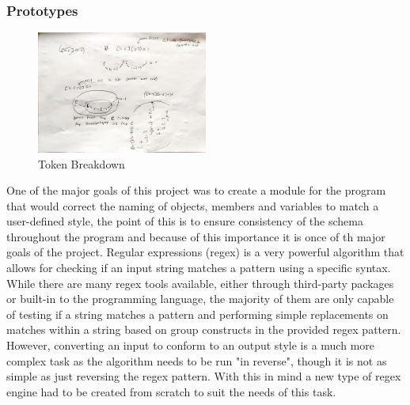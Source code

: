 \subsubsection{Prototypes}

\begin{figure}
    \centering
    \caption{Token Breakdown}
    \label{fig:TokenBreakdown}
    \includegraphics[angle=90,width=0.5\textwidth]{Figures/TokenBreakdown.jpg}
\end{figure}
One of the major goals of this project was to create a module for the program that would correct the naming of objects, members and variables to match a user-defined style, the point of this is to ensure consistency of the schema throughout the program and because of this importance it is once of th major goals of the project. Regular expressions (regex) is a very powerful algorithm that allows for checking if an input string matches a pattern using a specific syntax. While there are many regex tools available, either through third-party packages or built-in to the programming language, the majority of them are only capable of testing if a string matches a pattern and performing simple replacements on matches within a string based on group constructs in the provided regex pattern. However, converting an input to conform to an output style is a much more complex task as the algorithm needs to be run "in reverse", though it is not as simple as just reversing the regex pattern. With this in mind a new type of regex engine had to be created from scratch to suit the needs of this task.
